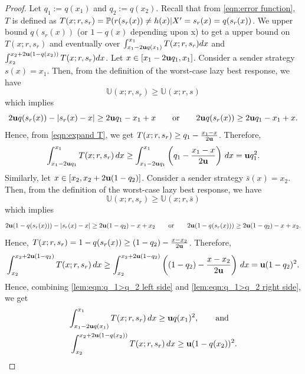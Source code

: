 \begin{proof}  Let $q_1 := q(x_1)$ and $q_2 := q(x_2)$. Recall that from \eqref{eqn:error function}, $T$ is defined as $T(x;r,s_r) = \mathbb{P}(r(s_r(x)) \neq h(x) |X'=s_r(x)  = q(s_r(x))$. We upper bound $q(s_r(x))$ (or $1-q(x)$ depending upon x) to get a upper bound on $T(x;r,s_r)$ and eventually over $\int_{x_1 - 2\mathbf{u} q(x_1)}^{x_1} T(x;r,s_r)dx$ and $\int_{x_2}^{x_2 + 2\mathbf{u}(1-q(x_2))} T(x;r,s_r)dx$.
     Let $x \in [x_1 - 2\mathbf{u} q_1, x_1]$. Consider a sender strategy $s(x) = x_1$. Then, from the definition of the worst-case lazy best response, we have
    \[
    \mathbb{U}(x;r,s_r) \geq \mathbb{U}(x;r,s)
    \]
    which implies
    \begin{equation}\label{eqn:expand T}
        2\mathbf{u} q(s_r(x)) - |s_r(x) - x| \geq 2\mathbf{u} q_1 - x_1 + x \quad \hbox{\quad or\quad} \quad 2\mathbf{u} q(s_r(x)) \geq 2\mathbf{u} q_1 - x_1 + x.
    \end{equation}
     Hence, from \eqref{eqn:expand T}, we get $T(x;r,s_r) \geq q_1 - \frac{x_1 - x}{2\mathbf{u}}$. Therefore,
    \begin{equation}\label{lem:eqn:q_1>q_2 left side}
        \int_{x_1 - 2\mathbf{u} q_1}^{x_1} T(x;r,s_r) \, dx \geq \int_{x_1 - 2\mathbf{u} q_1}^{x_1} \left( q_1 - \frac{x_1 - x}{2\mathbf{u}} \right) \, dx = \mathbf{u} q_1^2.
    \end{equation}
    Similarly, let $x \in [x_2, x_2 + 2\mathbf{u}(1-q_2)]$. Consider a sender strategy $\bar{s}(x) = x_2$. Then, from the definition of the worst-case lazy best response, we have
    \[
    \mathbb{U}(x;r,s_r) \geq \mathbb{U}(x;r,\bar{s})
    \]
    which implies
    \[
    2\mathbf{u} (1-q(s_r(x))) - |s_r(x) - x| \geq 2\mathbf{u} (1-q_2) - x + x_2 \quad \hbox{\quad or\quad} \quad 2\mathbf{u} (1-q(s_r(x))) \geq 2\mathbf{u} (1-q_2) - x + x_2.
    \]
    Hence, $T(x;r,s_r) = 1 - q(s_r(x)) \geq (1 - q_2) - \frac{x - x_2}{2\mathbf{u}}$. Therefore,
    \begin{equation}\label{lem:eqn:q_1>q_2 right side}
        \int_{x_2}^{x_2 + 2\mathbf{u} (1-q_2)} T(x;r,s_r) \, dx \geq \int_{x_2}^{x_2 + 2\mathbf{u} (1-q_2)} \left( (1 - q_2) - \frac{x - x_2}{2\mathbf{u}} \right) \, dx = \mathbf{u} (1-q_2)^2.
    \end{equation}
Hence, combining \eqref{lem:eqn:q_1>q_2 left side} and \eqref{lem:eqn:q_1>q_2 right side}, we get
    \begin{equation*}
    \begin{aligned}
        \int_{x_1 - 2\mathbf{u} q(x_1)}^{x_1} T(x;r,s_r) \, dx \geq \mathbf{u} q(x_1)^2, \quad \hbox{\quad and\quad} \\
        \int_{x_2}^{x_2 + 2\mathbf{u}(1-q(x_2))} T(x;r,s_r) \, dx \geq \mathbf{u} (1-q(x_2))^2.
    \end{aligned}
    \end{equation*}
\end{proof}


